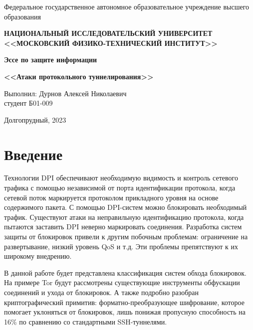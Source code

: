 
\newcommand{\boldm}[1]{{\boldsymbol{#1}}}

\usepackage{upgreek}


\begin{center}

    \normalsize{Федеральное государственное автономное образовательное учреждение высшего образования}

    \textbf{НАЦИОНАЛЬНЫЙ ИССЛЕДОВАТЕЛЬСКИЙ УНИВЕРСИТЕТ \\ <<МОСКОВСКИЙ ФИЗИКО-ТЕХНИЧЕСКИЙ ИНСТИТУТ>>}
    \vspace{13ex}

    \textbf{Эссе по защите информации}

    \textbf{<<Атаки протокольного туннелирования>>}
    \vspace{40ex}
\end{center}
\begin{flushright}
    \normalsize{Выполнил: Дурнов Алексей Николаевич \\ студент Б01-009 \\}
\end{flushright}

\vfill

\begin{center}
Долгопрудный, 2023
\end{center}

\thispagestyle{empty} %

\newpage

\tableofcontents{}
\newpage

\section{Введение}

Технологии DPI обеспечивают необходимую видимость и контроль сетевого трафика с помощью независимой от порта идентификации протокола,
когда сетевой поток маркируется протоколом прикладного уровня на основе содержимого пакета. С помощью DPI-систем можно блокировать необходимый трафик.
Существуют атаки на неправильную идентификацию протокола, когда пытаются заставить DPI неверно маркировать соединения.
Разработка систем защиты от блокировок привели к другим побочным проблемам: ограничение на развертывание, низкий уровень QoS и т.д.
Эти проблемы препятствуют к их широкому внедрению.

В данной работе будет представлена классификация систем обхода блокировок.
На примере Tor будут рассмотрены существующие инструменты обфускации соединений и ухода от блокировок.
А также подробно разобран криптографический примитив: форматно-преобразующее шифрование,
которое помогает уклоняться от блокировок, лишь понижая пропусную способность на 16\% по сравнению со стандартными SSH-туннелями.

